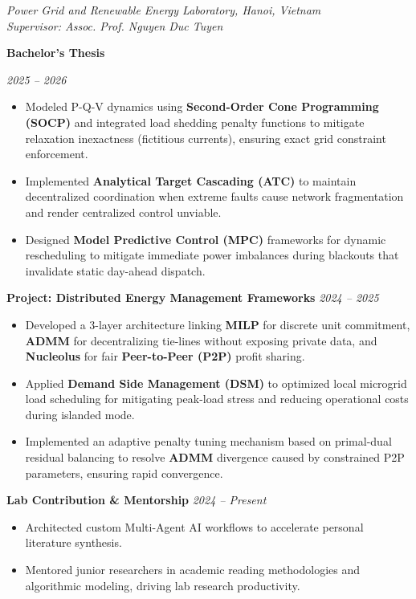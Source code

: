\documentclass[11pt,letterpaper]{article}
\begin{document}
\noindent\textit{Power Grid and Renewable Energy Laboratory, Hanoi, Vietnam}\\
\noindent\textit{Supervisor: Assoc. Prof. Nguyen Duc Tuyen}

\vspace{1ex}
\noindent \parbox[t]{0.82\linewidth}{\textbf{Bachelor's Thesis}}%
\hfill\parbox[t]{0.16\linewidth}{\raggedleft\textit{2025 -- 2026}}
\begin{itemize}[leftmargin=0.25in, itemsep=0pt, topsep=0pt]
    \item Modeled P-Q-V dynamics using \textbf{Second-Order Cone Programming (SOCP)} and integrated load shedding penalty functions to mitigate relaxation inexactness (fictitious currents), ensuring exact grid constraint enforcement.
    \item Implemented \textbf{Analytical Target Cascading (ATC)} to maintain decentralized coordination when extreme faults cause network fragmentation and render centralized control unviable.
    \item Designed \textbf{Model Predictive Control (MPC)} frameworks for dynamic rescheduling to mitigate immediate power imbalances during blackouts that invalidate static day-ahead dispatch.
\end{itemize}

\vspace{1ex}
\noindent\textbf{Project: Distributed Energy Management Frameworks} \hfill \textit{2024 -- 2025}
\begin{itemize}[leftmargin=0.25in, itemsep=0pt, topsep=0pt]
    \item Developed a 3-layer architecture linking \textbf{MILP} for discrete unit commitment, \textbf{ADMM} for decentralizing tie-lines without exposing private data, and \textbf{Nucleolus} for fair \textbf{Peer-to-Peer (P2P)} profit sharing.
    \item Applied \textbf{Demand Side Management (DSM)} to optimized local microgrid load scheduling for mitigating peak-load stress and reducing operational costs during islanded mode.
    \item Implemented an adaptive penalty tuning mechanism based on primal-dual residual balancing to resolve \textbf{ADMM} divergence caused by constrained P2P parameters, ensuring rapid convergence.
\end{itemize}

\vspace{1ex}
\noindent\textbf{Lab Contribution \& Mentorship} \hfill \textit{2024 -- Present}
\begin{itemize}[leftmargin=0.25in, itemsep=0pt, topsep=0pt]
    \item Architected custom Multi-Agent AI workflows to accelerate personal literature synthesis.
    \item Mentored junior researchers in academic reading methodologies and algorithmic modeling, driving lab research productivity.
\end{itemize}
\end{document}
